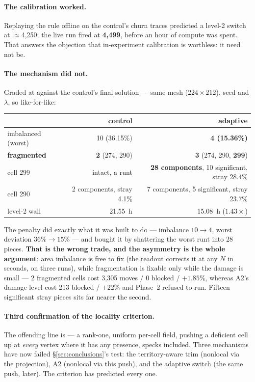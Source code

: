 \documentclass[11pt,a4paper]{article}
\begin{document}
\paragraph{The calibration worked.} Replaying the rule offline on the control's
churn traces predicted a level-2 switch at \(\approx\)4{,}250; the live run fired
at \textbf{4{,}499}, before an hour of compute was spent. That answers the
objection that in-experiment calibration is worthless: it need not be.

\paragraph{The mechanism did not.} Graded at 
against the control's final solution --- same mesh (\(224\times212\)), seed and
\(\lambda\), so like-for-like:

\begin{center}
\begin{tabular}{@{}lrr@{}}
\toprule
 & control & adaptive \\
\midrule
imbalanced (worst) & 10 (36.15\%) & \textbf{4 (15.36\%)} \\
\textbf{fragmented} & \textbf{2} (274, 290) & \textbf{3} (274, 290, \textbf{299}) \\
cell 299 & intact, a runt & \textbf{28 components}, 10 significant, stray 28.4\% \\
cell 290 & 2 components, stray 4.1\% & 7 components, 5 significant, stray 23.7\% \\
level-2 wall & 21.55~h & 15.08~h (\(1.43\times\)) \\
\bottomrule
\end{tabular}
\end{center}

The penalty did exactly what it was built to do --- imbalance \(10\to4\), worst
deviation \(36\%\to15\%\) --- and bought it by shattering the worst runt into 28
pieces. \textbf{That is the wrong trade, and the asymmetry is the whole
argument}: area imbalance is free to fix (the readout corrects it at any \(N\)
in seconds, on three runs), while fragmentation is fixable only while the damage
is small --- 2 fragmented cells cost 3{,}305 moves / 0 blocked / \(+1.85\%\),
whereas A2's damage level cost 213 blocked / \(+22\%\) and Phase~2 refused to
run. Fifteen significant stray pieces sits far nearer the second.

\paragraph{Third confirmation of the locality criterion.} The offending line is
 --- a rank-one, uniform
per-cell field, pushing a deficient cell up at \emph{every} vertex where it has
any presence, specks included. Three mechanisms have now failed
\S\ref{sec:conclusions}'s test: the territory-aware trim (nonlocal via the
projection), A2 (nonlocal via this push), and the adaptive switch (the same
push, later). The criterion has predicted every one.
\end{document}
